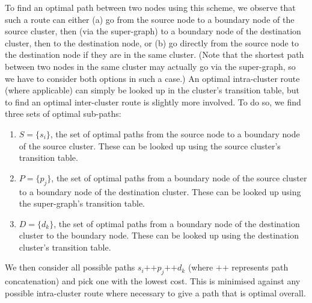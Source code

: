 
To find an optimal path between two nodes using this scheme, we observe that such a route can either (a) go from the source node to a boundary node of the source cluster, then (via the super-graph) to a boundary node of the destination cluster, then to the destination node, or (b) go directly from the source node to the destination node if they are in the same cluster. (Note that the shortest path between two nodes in the same cluster may actually go via the super-graph, so we have to consider both options in such a case.) An optimal intra-cluster route (where applicable) can simply be looked up in the cluster's transition table, but to find an optimal inter-cluster route is slightly more involved. To do so, we find three sets of optimal sub-paths:
%
\begin{enumerate}

\item $S = \{s_i\}$, the set of optimal paths from the source node to a boundary node of the source cluster. These can be looked up using the source cluster's transition table.
\item $P = \{p_j\}$, the set of optimal paths from a boundary node of the source cluster to a boundary node of the destination cluster. These can be looked up using the super-graph's transition table.
\item $D = \{d_k\}$, the set of optimal paths from a boundary node of the destination cluster to the boundary node. These can be looked up using the destination cluster's transition table.

\end{enumerate}
%
We then consider all possible paths $s_i \mbox{++} p_j \mbox{++} d_k$ (where $\mbox{++}$ represents path concatenation) and pick one with the lowest cost. This is minimised against any possible intra-cluster route where necessary to give a path that is optimal overall.

